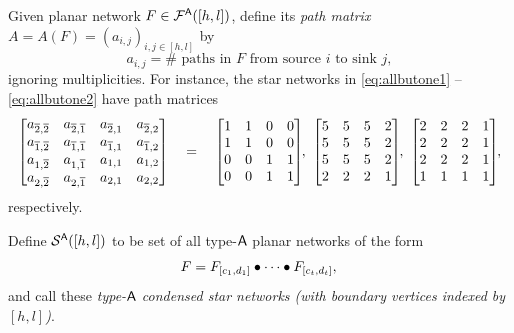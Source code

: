 \documentclass[11pt]{article}
\theoremstyle{definition}
\numberwithin{equation}{section}
\begin{document}
Given planar network $F \in \mathcal F^{\mathsf{A}}([h,l])$, define
its {\em path matrix} $A = A(F) = (a_{i,j})_{i,j \in [h,l]}$ by
\begin{equation}\label{eq:pathmatrix}
  a_{i,j} = \# \text{ paths in $F$ from source $i$ to sink $j$},
\end{equation}
ignoring multiplicities.
For instance, the star networks in
\eqref{eq:allbutone1} -- \eqref{eq:allbutone2}
have path matrices
\begin{equation*}
  \begin{bmatrix}
    a_{\overline{2},\overline{2}} & a_{\overline{2}, \overline{1}} & a_{\overline{2}, 1} & a_{\overline{2}, 2} \\
    a_{\overline{1},\overline{2}} & a_{\overline{1}, \overline{1}} & a_{\overline{1}, 1} & a_{\overline{1}, 2} \\
    a_{1,\overline{2}}   & a_{1, \overline{1}}   & a_{1, 1}   & a_{1, 2} \\
    a_{2,\overline{2}}   & a_{2, \overline{1}}   & a_{2, 1}   & a_{2, 2} 
  \end{bmatrix}
  \quad
  = 
  \quad
  \begin{bmatrix}
    1 & 1 & 0 & 0 \\
    1 & 1 & 0 & 0 \\
    0 & 0 & 1 & 1 \\
    0 & 0 & 1 & 1     
  \end{bmatrix}\negthickspace,
  \
  \begin{bmatrix}
    5 & 5 & 5 & 2 \\
    5 & 5 & 5 & 2 \\
    5 & 5 & 5 & 2 \\
    2 & 2 & 2 & 1
  \end{bmatrix}\negthickspace,
  \
  \begin{bmatrix}
    2 & 2 & 2 & 1 \\
    2 & 2 & 2 & 1 \\
    2 & 2 & 2 & 1 \\
    1 & 1 & 1 & 1     
  \end{bmatrix}\negthickspace,
\end{equation*}
respectively.

\begin{defn}\label{d:starnet}
Define $\mathcal S^{\mathsf{A}}([h,l])$ to be set of all type-$\mathsf{A}$ planar networks of the
form
\begin{equation}\label{eq:bulletconcat}
    F = F_{[c_1,d_1]} \bullet \cdots \bullet F_{[c_t,d_t]}, \\
\end{equation}
and call these
{\em type-$\mathsf{A}$ condensed star networks
  (with boundary vertices indexed by $[h,l]$)}.
\end{defn}
\end{document}
